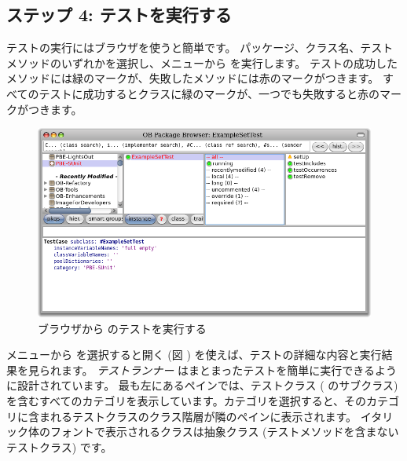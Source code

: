 \documentclass[a4paper,10pt,twoside]{book}
\begin{document}
\subsection{ステップ 4: テストを実行する}

テストの実行にはブラウザを使うと簡単です。
パッケージ、クラス名、テストメソッドのいずれかを選択し、メニューから  を実行します。
テストの成功したメソッドには緑のマークが、失敗したメソッドには赤のマークがつきます。
すべてのテストに成功するとクラスに緑のマークが、一つでも失敗すると赤のマークがつきます。

\begin{figure}[tbh]
  \begin{center}
	\includegraphics[width=\linewidth]{browser-tests}
	\caption{ブラウザから \sunit のテストを実行する}
  \end{center}
\end{figure}


 メニューから  を選択すると開く \sunit {} (図 ) を使えば、テストの詳細な内容と実行結果を見られます。
\emph{テストランナー} はまとまったテストを簡単に実行できるように設計されています。
最も左にあるペインでは、テストクラス (\ie {} のサブクラス) を含むすべてのカテゴリを表示しています。カテゴリを選択すると、そのカテゴリに含まれるテストクラスのクラス階層が隣のペインに表示されます。
イタリック体のフォントで表示されるクラスは抽象クラス (テストメソッドを含まないテストクラス) です。

\end{document}
